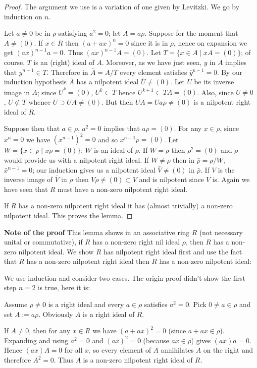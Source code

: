 \documentclass{article}
\begin{document}
\begin{proof}  
The argument we use is a variation of one given by Levitzki. We go by induction on $n$.  

Let $a \neq 0$ be in $\rho$ satisfying $a^2 = 0$; let $A = a\rho$. Suppose for the moment that $A \neq (0)$. If $x \in R$ then $(a+ax)^n = 0$ since it is in $\rho$, hence on expansion we get $(ax)^{n-1}a = 0$. Thus $(ax)^{n-1}A = (0)$. Let $T = \{x \in A \mid xA = (0)\}$; of course, $T$ is an (right) ideal of $A$. Moreover, as we have just seen, $y$ in $A$ implies that $y^{n-1} \in T$. Therefore in $\bar{A} = A/T$ every element satisfies $\bar{y}^{n-1} = 0$. By our induction hypothesis $\bar{A}$ has a nilpotent ideal $\bar{U} \neq (0)$. Let $U$ be its inverse image in $A$; since $\bar{U}^k = (0)$, $U^k \subset T$ hence $U^{k+1} \subset TA = (0)$. Also, since $\bar{U} \neq 0$, $U \not\subset T$ whence $U \supset UA \neq (0)$. But then $UA = Ua\rho \neq (0)$ is a nilpotent right ideal of $R$.  

Suppose then that $a \in \rho$, $a^2 = 0$ implies that $a\rho = (0)$. For any $x \in \rho$, since $x^n = 0$ we have $(x^{n-1})^2 = 0$ and so $x^{n-1}\rho = (0)$. Let $W = \{x \in \rho \mid x\rho = (0)\}$; $W$ is an ideal of $\rho$. If $W = \rho$ then $\rho^2 = (0)$ and $\rho$ would provide us with a nilpotent right ideal. If $W \neq \rho$ then in $\bar{\rho} = \rho/W$, $\bar{x}^{n-1} = 0$; our induction gives us a nilpotent ideal $\bar{V} \neq (0)$ in $\bar{\rho}$. If $V$ is the inverse image of $\bar{V}$ in $\rho$ then $V\rho \neq (0) \subset V$ and is nilpotent since $V$ is. Again we have seen that $R$ must have a non-zero nilpotent right ideal.  

If $R$ has a non-zero nilpotent right ideal it has (almost trivially) a non-zero nilpotent ideal. This proves the lemma.  
\end{proof} 

\begin{tcolorbox}[colback=gray!20, colframe=black] 
\textbf{Note of the proof}
This lemma shows in an associative ring $ R $ (not necessary unital or commutative), if $ R $ has a non-zero right nil ideal $ \rho $, then $ R $ has a non-zero nilpotent ideal. We show $ R $ has nilpotent right ideal first and use the fact that $ R $ has a non-zero nilpotent right ideal then $ R $ has a non-zero nilpotent ideal:

We use induction and consider two cases. The origin proof didn't show the first step $ n=2 $ is true, here it is:  

Assume $\rho \neq 0$ is a right ideal and every $a \in \rho$ satisfies $a^2 = 0$. Pick $0 \neq a \in \rho$ and set $A := a\rho$. Obviously $A$ is a right ideal of $R$.

If $A \neq 0$, then for any $x \in R$ we have $(a + ax)^2 = 0$ (since $a + ax \in \rho$). Expanding and using $a^2 = 0$ and $(ax)^2 = 0$ (because $ax \in \rho$) gives $(ax)a = 0$. Hence $(ax)A = 0$ for all $x$, so every element of $A$ annihilates $A$ on the right and therefore $A^2 = 0$. Thus $A$ is a non-zero nilpotent right ideal of $R$.
\end{tcolorbox}
\end{document}
